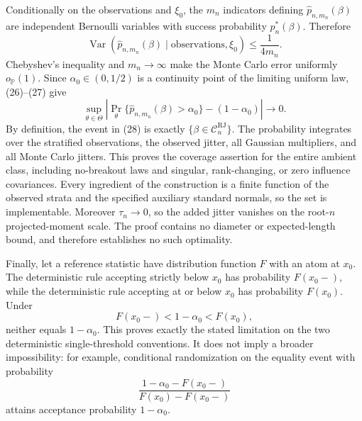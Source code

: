 Conditionally on the observations and \(\xi_0\), the \(m_n\) indicators defining
\(\widehat p_{n,m_n}(\beta)\) are independent Bernoulli variables with success probability \(p_n^*(\beta)\).  Therefore
\[
 \operatorname{Var}\!\left(
 \widehat p_{n,m_n}(\beta)\mid\text{observations},\xi_0
 \right)\leq\frac1{4m_n}. \tag{27}
\]
Chebyshev's inequality and \(m_n\to\infty\) make the Monte Carlo error uniformly \(o_{\mathbb P}(1)\).  Since \(\alpha_0\in(0,1/2)\) is a continuity point of the limiting uniform law, (26)--(27) give
\[
 \sup_{\theta\in\Theta}
 \left|\Pr_\theta\{\widehat p_{n,m_n}(\beta)>\alpha_0\}
 -(1-\alpha_0)\right|\longrightarrow0. \tag{28}
\]
By definition, the event in (28) is exactly
\(\{\beta\in\mathcal C_n^{\mathrm{RJ}}\}\).  The probability integrates over the stratified observations, the observed jitter, all Gaussian multipliers, and all Monte Carlo jitters.  This proves the coverage assertion for the entire ambient class, including no-breakout laws and singular, rank-changing, or zero influence covariances.  Every ingredient of the construction is a finite function of the observed strata and the specified auxiliary standard normals, so the set is implementable.  Moreover \(\tau_n\to0\), so the added jitter vanishes on the root-\(n\) projected-moment scale.  The proof contains no diameter or expected-length bound, and therefore establishes no such optimality.

Finally, let a reference statistic have distribution function \(F\) with an atom at \(x_0\).  The deterministic rule accepting strictly below \(x_0\) has probability \(F(x_0-)\), while the deterministic rule accepting at or below \(x_0\) has probability \(F(x_0)\).  Under
\[
 F(x_0-)<1-\alpha_0<F(x_0),
\]
neither equals \(1-\alpha_0\).  This proves exactly the stated limitation on the two deterministic single-threshold conventions.  It does not imply a broader impossibility: for example, conditional randomization on the equality event with probability
\[
 \frac{1-\alpha_0-F(x_0-)}{F(x_0)-F(x_0-)}
\]
attains acceptance probability \(1-\alpha_0\).
